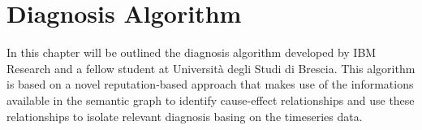 \chapter{Diagnosis Algorithm} \label{ch:diagnosis}
In this chapter will be outlined the diagnosis algorithm developed by IBM Research and a fellow student at Università degli Studi di Brescia. This algorithm is based on a novel reputation-based approach that makes use of the informations available in the semantic graph to identify cause-effect relationships and use these relationships to isolate relevant diagnosis basing on the timeseries data.
